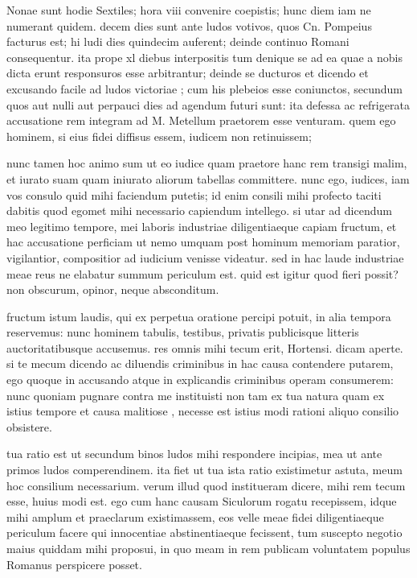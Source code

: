  Nonae sunt hodie Sextiles; hora viii convenire coepistis; hunc diem iam ne numerant quidem. decem dies sunt ante ludos votivos, quos Cn. Pompeius facturus est; hi ludi dies quindecim auferent; deinde continuo Romani consequentur. ita prope xl diebus interpositis tum denique se ad ea quae a nobis dicta erunt responsuros esse arbitrantur; deinde se ducturos et dicendo et excusando facile ad ludos victoriae ; cum his plebeios esse coniunctos, secundum quos aut nulli aut perpauci dies ad agendum futuri sunt: ita defessa ac refrigerata accusatione rem integram ad M. Metellum praetorem esse venturam. quem ego hominem, si eius fidei diffisus essem, iudicem non retinuissem;

 nunc tamen hoc animo sum ut eo iudice quam praetore hanc rem transigi malim, et iurato suam quam iniurato aliorum tabellas committere. nunc ego, iudices, iam vos consulo quid mihi faciendum putetis; id enim consili mihi profecto taciti dabitis quod egomet mihi necessario capiendum intellego. si utar ad dicendum meo legitimo tempore, mei laboris industriae diligentiaeque capiam fructum, et hac accusatione perficiam ut nemo umquam post hominum memoriam paratior, vigilantior, compositior ad iudicium venisse videatur. sed in hac laude industriae meae reus ne elabatur summum periculum est. quid est igitur quod fieri possit? non obscurum, opinor, neque absconditum.

 fructum istum laudis, qui ex perpetua oratione percipi potuit, in alia tempora reservemus: nunc hominem tabulis, testibus, privatis publicisque litteris auctoritatibusque accusemus. res omnis mihi tecum erit, Hortensi. dicam aperte. si te mecum dicendo ac diluendis criminibus in hac causa contendere putarem, ego quoque in accusando atque in explicandis criminibus operam consumerem: nunc quoniam pugnare contra me instituisti non tam ex tua natura quam ex istius tempore et causa malitiose , necesse est istius modi rationi aliquo consilio obsistere.

 tua ratio est ut secundum binos ludos mihi respondere incipias, mea ut ante primos ludos comperendinem. ita fiet ut tua ista ratio existimetur astuta, meum hoc consilium necessarium. verum illud quod institueram dicere, mihi rem tecum esse, huius modi est. ego cum hanc causam Siculorum rogatu recepissem, idque mihi amplum et praeclarum existimassem, eos velle meae fidei diligentiaeque periculum facere qui innocentiae abstinentiaeque fecissent, tum suscepto negotio maius quiddam mihi proposui, in quo meam in rem publicam voluntatem populus Romanus perspicere posset.

